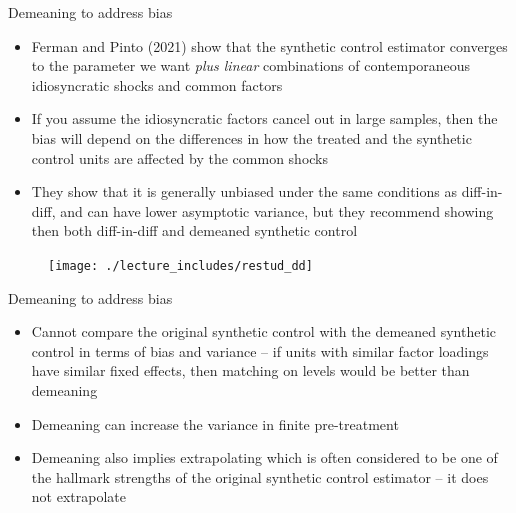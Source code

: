 \documentclass{beamer}
\begin{document}
\begin{frame}{Demeaning to address bias}

\begin{itemize}
\item Ferman and Pinto (2021) show that the synthetic control estimator converges to the parameter we want \emph{plus linear} combinations of contemporaneous idiosyncratic shocks and common factors
\item If you assume the idiosyncratic factors cancel out in large samples, then the bias will depend on the differences in how the treated and the synthetic control units are affected by the common shocks
\item They show that it is generally unbiased under the same conditions as diff-in-diff, and can have lower asymptotic variance, but they recommend showing then both diff-in-diff and demeaned synthetic control

\end{itemize}

\end{frame}


\begin{frame}{}

\begin{figure}
\texttt{[image: ./lecture\_includes/restud\_dd]}
\end{figure}

\end{frame}



\begin{frame}{Demeaning to address bias}

\begin{itemize}

\item Cannot compare the original synthetic control with the demeaned synthetic control in terms of bias and variance -- if units with similar factor loadings have similar fixed effects, then matching on levels would be better than demeaning 
\item Demeaning can increase the variance in finite pre-treatment
\item Demeaning also implies extrapolating which is often considered to be one of the hallmark strengths of the original synthetic control estimator -- it does not extrapolate 

\end{itemize}

\end{frame}
\end{document}
